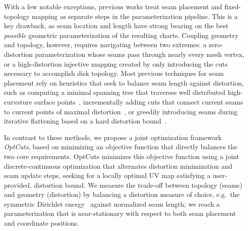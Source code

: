 With a few notable exceptions, previous works treat seam placement and fixed-topology mapping as separate steps in the parameterization pipeline.  This is a key drawback, as seam location and length have strong bearing on the best \emph{possible} geometric parameterization of the resulting charts.  Coupling geometry and topology, however, requires navigating between two extremes: a zero-distortion parameterization whose seams pass through nearly every mesh vertex, or a high-distortion injective mapping created by only introducing the cuts necessary to accomplish disk topology.
%
%
Most previous techniques for seam placement rely on heuristics that seek to balance seam length against distortion, such as computing a minimal spanning tree that traverses well distributed high-curvature surface points~\cite{Sheffer2002Seamster}, incrementally adding cuts that connect current seams to current points of maximal distortion~\cite{Gu2002Geometry}, or greedily introducing seams during iterative flattening based on a hard distortion bound~\cite{BoundedDistortParam:2002}. 

In contrast to these methods, we propose a joint optimization framework {\em OptCuts}, based on minimizing an objective function that directly balances the two core requirements.%
OptCuts minimizes this objective function using a joint discrete-continuous optimization that alternates distortion minimization and seam update steps,  seeking for a locally optimal UV map satisfying a user-provided, distortion bound. 
%
We measure the trade-off between topology (seams) and geometry (distortion) by balancing a distortion measure of choice, e.g.\ the symmetric Dirichlet energy~\cite{Smith2015Bijective} against normalized seam length; we reach a parameterization that is near-stationary with respect to both seam placement and coordinate positions. %

